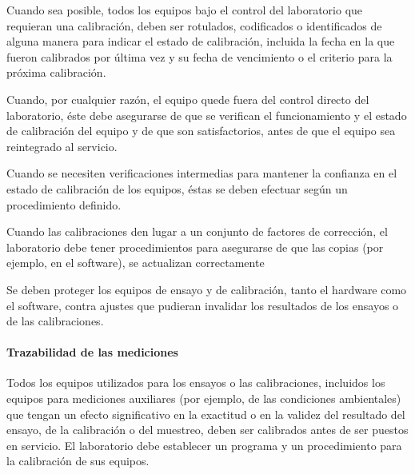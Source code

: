 \par \noindent
Cuando sea posible, todos los equipos bajo el control del laboratorio que requieran una calibración,
deben ser rotulados, codificados o identificados de alguna manera para indicar el estado de calibración,
incluida la fecha en la que fueron calibrados por última vez y su fecha de vencimiento o el criterio para la
próxima calibración.

\par \noindent
Cuando, por cualquier razón, el equipo quede fuera del control directo del laboratorio, éste debe
asegurarse de que se verifican el funcionamiento y el estado de calibración del equipo y de que son
satisfactorios, antes de que el equipo sea reintegrado al servicio.

\par \noindent
Cuando se necesiten verificaciones intermedias para mantener la confianza en el estado de
calibración de los equipos, éstas se deben efectuar según un procedimiento definido.

\par \noindent
Cuando las calibraciones den lugar a un conjunto de factores de corrección, el laboratorio debe tener
procedimientos para asegurarse de que las copias (por ejemplo, en el software), se actualizan correctamente

\par \noindent
Se deben proteger los equipos de ensayo y de calibración, tanto el hardware como el software,
contra ajustes que pudieran invalidar los resultados de los ensayos o de las calibraciones.

\paragraph{Trazabilidad de las mediciones}
\par 
Todos los equipos utilizados para los ensayos o las calibraciones, incluidos los equipos para mediciones
auxiliares (por ejemplo, de las condiciones ambientales) que tengan un efecto significativo en la exactitud o
en la validez del resultado del ensayo, de la calibración o del muestreo, deben ser calibrados antes de ser
puestos en servicio. El laboratorio debe establecer un programa y un procedimiento para la calibración de sus
equipos.

